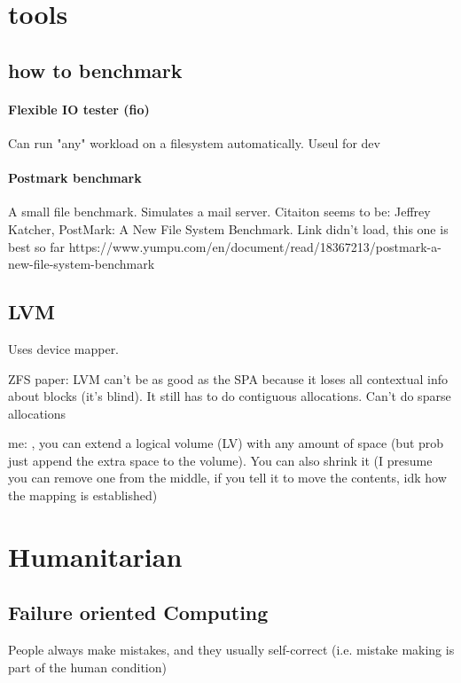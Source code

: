 \documentclass[a4paper]{report}
\begin{document}
\section{tools}
    \subsection{how to benchmark}

        \paragraph{Flexible IO tester (fio)} Can run "any" workload on a
        filesystem automatically. Useul for dev

        \paragraph{Postmark benchmark} A small file benchmark. Simulates a mail
        server.
        Citaiton seems to be: Jeffrey Katcher, PostMark: A New File System
        Benchmark. Link didn't load, this one is best so far
        https://www.yumpu.com/en/document/read/18367213/postmark-a-new-file-system-benchmark

    \subsection{LVM}
        Uses device mapper.

        ZFS paper: LVM can't be as good as the SPA because it loses all contextual
        info about blocks (it's blind). It still has to do contiguous allocations.
        Can't do sparse allocations

        me: , you can extend a logical volume (LV) with any amount of space (but
        prob just append the extra space to the volume). You can also shrink it (I
        presume you can remove one from the middle, if you tell it to move the
        contents, idk how the mapping is established)


\section{Humanitarian}
    \subsection{Failure oriented Computing}

        People always make mistakes, and they usually self-correct (i.e.
        mistake making is part of the human condition)
\end{document}
